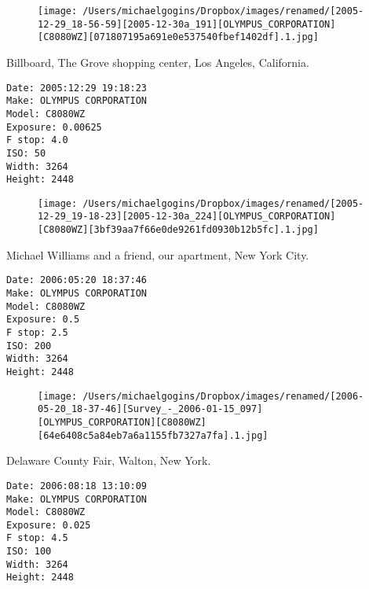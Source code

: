 \documentclass[11pt,letter,DIV=14,paper=landscape]{scrbook}
\begin{document}
\begin{figure}
\texttt{[image: /Users/michaelgogins/Dropbox/images/renamed/[2005-12-29\_18-56-59][2005-12-30a\_191][OLYMPUS\_CORPORATION][C8080WZ][071807195a691e0e537540fbef1402df].1.jpg]}
\end{figure}
    
\clearpage
\noindent Billboard, The Grove shopping center, Los Angeles, California.
\noindent
\begin{lstlisting}
Date: 2005:12:29 19:18:23
Make: OLYMPUS CORPORATION
Model: C8080WZ
Exposure: 0.00625
F stop: 4.0
ISO: 50
Width: 3264
Height: 2448
\end{lstlisting}
\clearpage

\begin{figure}
\texttt{[image: /Users/michaelgogins/Dropbox/images/renamed/[2005-12-29\_19-18-23][2005-12-30a\_224][OLYMPUS\_CORPORATION][C8080WZ][3bf39aa7f66e0de9261fd0930b12b5fc].1.jpg]}
\end{figure}
    
\clearpage
\noindent Michael Williams and a friend, our apartment, New York City.
\noindent
\begin{lstlisting}
Date: 2006:05:20 18:37:46
Make: OLYMPUS CORPORATION
Model: C8080WZ
Exposure: 0.5
F stop: 2.5
ISO: 200
Width: 3264
Height: 2448
\end{lstlisting}
\clearpage

\begin{figure}
\texttt{[image: /Users/michaelgogins/Dropbox/images/renamed/[2006-05-20\_18-37-46][Survey\_-\_2006-01-15\_097][OLYMPUS\_CORPORATION][C8080WZ][64e6408c5a84eb7a6a1155fb7327a7fa].1.jpg]}
\end{figure}
    
\clearpage
\noindent Delaware County Fair, Walton, New York.
\noindent
\begin{lstlisting}
Date: 2006:08:18 13:10:09
Make: OLYMPUS CORPORATION
Model: C8080WZ
Exposure: 0.025
F stop: 4.5
ISO: 100
Width: 3264
Height: 2448
\end{lstlisting}
\clearpage
\end{document}
